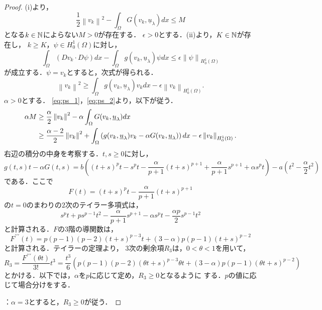 \begin{proof}
 (i)より，
 \begin{equation}
  \frac{1}{2} \left\| v_k \right\|^2 - \int_\Omega G(v_k,
   \underline{u}_\lambda )dx \leq M \label{eq:ps_1}
 \end{equation}
 となる$k \in \mathbb{N}$によらない$M > 0$が存在する．
 $\epsilon > 0$とする．(ii)より，$K \in \mathbb{N}$が存在し，
 $k \geq K$，$\psi \in H_0^1(\Omega)$に対し，
 \[
  \int_\Omega (D v_k \cdot D \psi) dx - \int_\Omega g(v_k,
 \underline{u}_\lambda)\psi dx \leq \epsilon \left\| \psi
 \right\|_{H_0^1(\Omega) }
 \]
 が成立する．$\psi = v_k$とすると，次式が得られる．
 \begin{equation}
  \left\| v_k \right\|^2 \geq \int_\Omega g(v_k,
   \underline{u}_\lambda)v_k dx - \epsilon \left\| v_k
   \right\|_{H_0^1(\Omega)}. \label{eq:ps_2}
 \end{equation}
 $\alpha > 0$とする．
 \eqref{eq:ps_1}，\eqref{eq:ps_2}より，以下が従う．
 \begin{align}
  \alpha M &\geq  \frac{\alpha}{2} \left\| v_k \right\|^2 - \alpha
  \int_\Omega G(v_k, \underline{u}_\lambda) dx \notag \\
  & \geq \frac{\alpha-2}{2} \left\| v_k \right\|^2 + \int_\Omega 
  \left( g(v_k, \underline{u}_\lambda)v_k - \alpha G(v_k,
  \underline{u}_\lambda)  \right) dx - \epsilon \left\| v_k
  \right\|_{H^1_0(\Omega)}. \label{eq:alpha_M}
 \end{align}
 右辺の積分の中身を考察する．$t, s \geq 0$に対し，
 \[
   g(t, s)t - \alpha G(t, s)
  = b \left( (t+s)^p t - s^p t - \frac{\alpha}{p+1}(t+s)^{p+1} +
  \frac{\alpha}{p+1}s^{p+1} + \alpha s^p t \right) - a \left( t^2 -
  \frac{\alpha}{2} t^2 \right)
 \]
 である．ここで
 \[
  F(t) = (t+s)^p t - \frac{\alpha}{p+1}(t+s)^{p+1}
 \]
 の$t = 0$のまわりの$2$次のテイラー多項式は，
 \[
 s^pt + ps^{p-1} t^2 - \frac{\alpha}{p+1} s^{p+1} - \alpha s^p t -
 \frac{\alpha p}{2} s^{p-1} t^2 
 \]
 と計算される．$F$の$3$階の導関数は，
 \[
  F^{\prime\prime\prime}(t) = p(p-1)(p-2)(t+s)^{p-3} t + (3 - \alpha)
 p(p-1) (t+s)^{p-2}
 \]
 と計算される．テイラーの定理より，
 $3$次の剰余項$R_3$は，$0 < \theta < 1$を用いて，
 \[
  R_3 = \frac{F^{\prime\prime\prime}(\theta t)}{3!}t^3 = \frac{t^3}{6}
 \left( p(p-1)(p-2)(\theta t + s)^{p-3} \theta t + (3-\alpha) p(p-1)
 (\theta t + s)^{p-2} \right)
 \]
 とかける．以下では，$\alpha$を$p$に応じて定め，$R_3 \geq 0$となるように
 する．$p$の値に応じて場合分けをする．

 ：$\alpha = 3$とすると，$R_3 \geq 0$が従う．


\end{proof}
